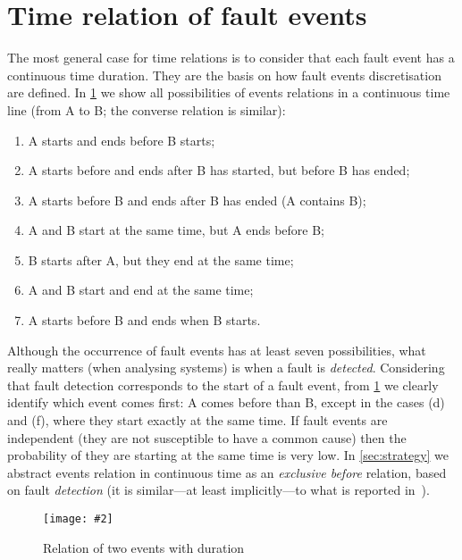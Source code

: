 \documentclass[en,twoside,onehalfspacing,phd]{risethesis}
\newcommand{\includegraphicsaspectratio}[2][1]{%
  \texttt{[image: \#2]}%
}
\begin{document}
\section{Time relation of fault events}
\label{sec:time-relations}

The most general case for time relations is to consider that each fault event has a continuous time duration.
They are the basis on how fault events discretisation are defined.
In \cref{fig:time-relations} we show all possibilities of events relations in a continuous time line (from A to B; the converse relation is similar):

\begin{enumerate}\renewcommand{\theenumi}{\alph{enumi}}
  \item A starts and ends before B starts;
  \item A starts before and ends after B has started, but before B has ended;
  \item A starts before B and ends after B has ended (A contains B);
  \item A and B start at the same time, but A ends before B;
  \item B starts after A, but they end at the same time;
  \item A and B start and end at the same time;
  \item A starts before B and ends when B starts.
\end{enumerate}

Although the occurrence of fault events has at least seven possibilities, what really matters (when analysing systems) is when a fault is \emph{detected}.
Considering that fault detection corresponds to the start of a fault event, from \cref{fig:time-relations} we clearly identify which event comes first: A comes before than B, except in the cases (d) and (f), where they start exactly at the same time.
If fault events are independent (they are not susceptible to have a common cause) then the probability of they are starting at the same time is very low.
In \cref{sec:strategy} we abstract events relation in continuous time as an \emph{exclusive before} relation, based on fault \emph{detection} (it is similar---at least implicitly---to what is reported in~\cite{WP2009,MRL2011}).


\begin{figure}[t]
  \centering
  \includegraphicsaspectratio[0.5]{time-relations}
  \caption{Relation of two events with duration}
  \label{fig:time-relations}
\end{figure}
\end{document}

